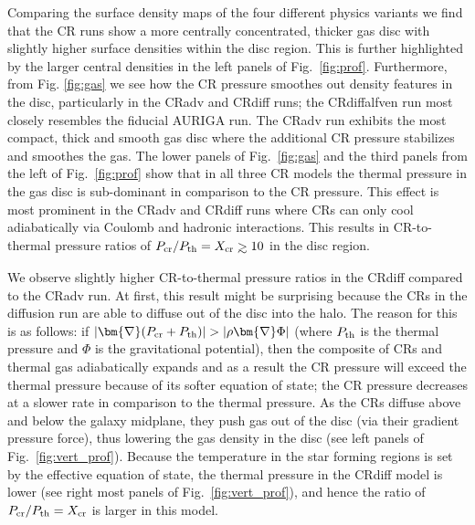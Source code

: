 \documentclass[useAMS,usenatbib]{mnras}
\def\gtrsim{\mathrel{\hbox{\rlap{\hbox{\lower4pt\hbox{$\sim$}}}\hbox{$>$}}}}
\newcommand{\bnabla}{\bm{\nabla}}
\begin{document}
Comparing the surface density maps of the four different physics variants we find that the CR runs show a more centrally concentrated, thicker gas disc with slightly higher surface densities within the disc region. This is further highlighted by the larger central densities in the left panels of Fig.\ \ref{fig:prof}. Furthermore, from Fig. \ref{fig:gas} we see how the CR pressure smoothes out density features in the disc, particularly in the CRadv and CRdiff runs; the CRdiffalfven run most closely resembles the fiducial AURIGA run. The CRadv run exhibits the most compact, thick and smooth gas disc where the additional CR pressure stabilizes and smoothes the gas. The lower panels of Fig.\ \ref{fig:gas} and the third panels from the left of Fig.\ \ref{fig:prof} show that in all three CR models the thermal pressure in the gas disc is sub-dominant in comparison to the CR pressure. This effect is most prominent in the CRadv and CRdiff runs where CRs can only cool adiabatically via Coulomb and hadronic interactions. This results in CR-to-thermal pressure ratios of $P_{\rm cr}/P_{\rm th}=X_{\rm cr}\gtrsim10$ in the disc region.

We observe slightly higher CR-to-thermal pressure ratios in the CRdiff compared to the CRadv run. At first, this result might be surprising because the CRs in the diffusion run are able to diffuse out of the disc into the halo. The reason for this is as follows: if $\vert \bnabla (P_{\rm cr} + P_{\rm th}) \vert > \vert \rho \bnabla \Phi \vert$ (where $P_{\rm th}$ is the thermal pressure and $\Phi$ is the gravitational potential), then the composite of CRs and thermal gas adiabatically expands and as a result the CR pressure will exceed the thermal pressure because of its softer equation of state; the CR pressure decreases at a slower rate in comparison to the thermal pressure. As the CRs diffuse above and below the galaxy midplane, they push gas out of the disc (via their gradient pressure force), thus lowering the gas density in the disc (see left panels of Fig.~\ref{fig:vert_prof}). Because the temperature in the star forming regions is set by the effective equation of state, the thermal pressure in the CRdiff model is lower (see right most panels of Fig.~\ref{fig:vert_prof}), and hence the ratio of $P_{\rm cr}/P_{\rm th}=X_{\rm cr}$ is larger in this model.
\end{document}
